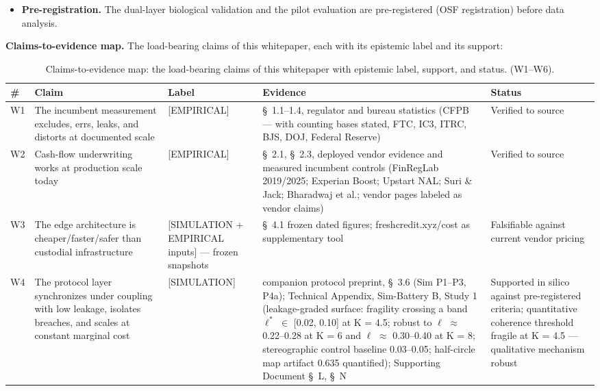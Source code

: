 \documentclass[11pt,twocolumn]{article}
\begin{document}
\begin{itemize}
\item \textbf{Pre-registration.} The dual-layer biological validation and the pilot evaluation are pre-registered (OSF registration) before data analysis.
\end{itemize}

\textbf{Claims-to-evidence map.} The load-bearing claims of this whitepaper, each with its epistemic label and its support:

\begin{table}[t!]
\centering
\footnotesize
\caption{Claims-to-evidence map: the load-bearing claims of this whitepaper with epistemic label, support, and status. (W1--W6).}\label{tab:claims}
\begin{tabular}{@{}p{} p{} p{} p{} p{}@{}}
\toprule
\# & Claim & Label & Evidence & Status \\
\midrule
W1 & The incumbent measurement excludes, errs, leaks, and distorts at documented scale & \hspace{0pt}[EMPIRICAL] & \S~1.1--1.4, regulator and bureau statistics (CFPB --- with counting bases stated, FTC, IC3, ITRC, BJS, DOJ, Federal Reserve) & Verified to source \\
W2 & Cash-flow underwriting works at production scale today & \hspace{0pt}[EMPIRICAL] & \S~2.1, \S~2.3, deployed vendor evidence and measured incumbent controls (FinRegLab 2019/2025; Experian Boost; Upstart NAL; Suri \& Jack; Bharadwaj et al.; vendor pages labeled as vendor claims) & Verified to source \\
W3 & The edge architecture is cheaper/faster/safer than custodial infrastructure & \hspace{0pt}[SIMULATION + EMPIRICAL inputs] --- frozen snapshots & \S~4.1 frozen dated figures; freshcredit.xyz/cost as supplementary tool & Falsifiable against current vendor pricing \\
W4 & The protocol layer synchronizes under coupling with low leakage, isolates breaches, and scales at constant marginal cost & \hspace{0pt}[SIMULATION] & companion protocol preprint, \S~3.6 (Sim P1--P3, P4a); Technical Appendix, Sim-Battery B, Study 1 (leakage-graded surface: fragility crossing a band $\ell^{*}$ $\in$ [0.02, 0.10] at K = 4.5; robust to $\ell$ $\approx$ 0.22--0.28 at K = 6 and $\ell$ $\approx$ 0.30--0.40 at K = 8; stereographic control baseline 0.03--0.05; half-circle map artifact 0.635 quantified); Supporting Document \S~L, \S~N & Supported in silico against pre-registered criteria; quantitative coherence threshold fragile at K = 4.5 --- qualitative mechanism robust \\

\end{tabular}
\end{table}
\end{document}
